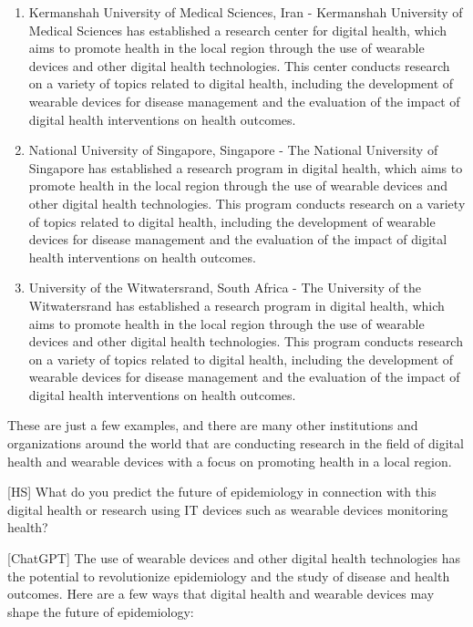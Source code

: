 \documentclass[
]{bxjsbook}
\providecommand{\tightlist}{%
  \setlength{\itemsep}{0pt}\setlength{\parskip}{0pt}}
\theoremstyle{definition}
\theoremstyle{definition}
\theoremstyle{definition}
\theoremstyle{definition}
\theoremstyle{remark}
\begin{document}
\begin{enumerate}
\def\labelenumi{\arabic{enumi}.}
\tightlist
\item
  Kermanshah University of Medical Sciences, Iran - Kermanshah University of Medical Sciences has established a research center for digital health, which aims to promote health in the local region through the use of wearable devices and other digital health technologies. This center conducts research on a variety of topics related to digital health, including the development of wearable devices for disease management and the evaluation of the impact of digital health interventions on health outcomes.
\item
  National University of Singapore, Singapore - The National University of Singapore has established a research program in digital health, which aims to promote health in the local region through the use of wearable devices and other digital health technologies. This program conducts research on a variety of topics related to digital health, including the development of wearable devices for disease management and the evaluation of the impact of digital health interventions on health outcomes.
\item
  University of the Witwatersrand, South Africa - The University of the Witwatersrand has established a research program in digital health, which aims to promote health in the local region through the use of wearable devices and other digital health technologies. This program conducts research on a variety of topics related to digital health, including the development of wearable devices for disease management and the evaluation of the impact of digital health interventions on health outcomes.
\end{enumerate}

These are just a few examples, and there are many other institutions and organizations around the world that are conducting research in the field of digital health and wearable devices with a focus on promoting health in a local region.

{[}HS{]} What do you predict the future of epidemiology in connection with this digital health or research using IT devices such as wearable devices monitoring health?

{[}ChatGPT{]} The use of wearable devices and other digital health technologies has the potential to revolutionize epidemiology and the study of disease and health outcomes. Here are a few ways that digital health and wearable devices may shape the future of epidemiology:
\end{document}
